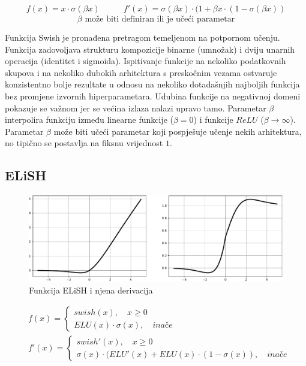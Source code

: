 \documentclass[times, utf8, numeric, diplomski]{fer}
\def\otherwise{\textit{inače}}
\begin{document}
\begin{equation}
\label{eq:swish}
\begin{split}
f(x) = x \cdot \sigma(\beta x)
\end{split}
\qquad
\begin{split}
f'(x) = \sigma(\beta x) \cdot (1 + \beta x \cdot (1-\sigma(\beta x))
\end{split}
\end{equation}
\begin{equation*}
\beta \text{ može biti definiran ili je učeći parametar}
\end{equation*}

Funkcija Swish je pronađena pretragom temeljenom na potpornom učenju. Funkcija zadovoljava strukturu kompozicije binarne (umnožak) i dviju unarnih operacija (identitet i sigmoida). Ispitivanje funkcije na nekoliko podatkovnih skupova i na nekoliko dubokih arhitektura s preskočnim vezama ostvaruje konzistentno bolje rezultate u odnosu na nekoliko dotadašnjih najboljih funkcija bez promjene izvornih hiperparametara. Udubina funkcije na negativnoj domeni pokazuje se važnom jer se većina izlaza nalazi upravo tamo. Parametar $\beta$ interpolira funkciju između linearne funkcije ($\beta=0$) i funkcije $ReLU$ ($\beta \rightarrow \infty$). Parametar $\beta$ može biti učeći parametar koji pospješuje učenje nekih arhitektura, no tipično se postavlja na fiksnu vrijednost $1$. \citep{swish}

\subsection{ELiSH}
\label{func:elish}

\begin{figure}[H]
\includegraphics[width=\textwidth]{func_ELiSH.pdf}
\centering
\caption{Funkcija ELiSH i njena derivacija}
\label{fig:elish}
\end{figure}

\begin{equation}
\begin{split}
&f(x) = 
	\begin{cases}
		swish(x), \quad x \geq 0 \\
		ELU(x) \cdot \sigma(x), \quad \otherwise
	\end{cases} \\
&f'(x) =
	\begin{cases}
		swish'(x), \quad x \geq 0 \\
		\sigma(x) \cdot (ELU'(x) + ELU(x) \cdot (1-\sigma(x)), \quad \otherwise
	\end{cases}
\end{split}
\end{equation}
\end{document}
